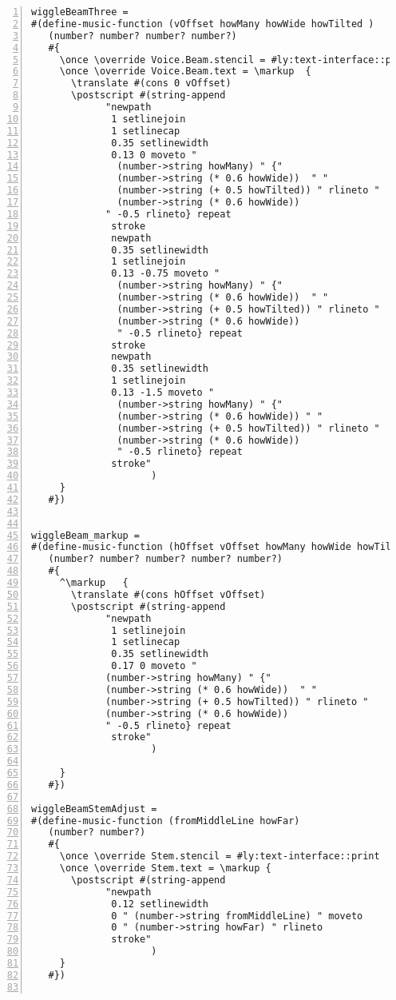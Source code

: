 \begin{Verbatim}[numbers=left,xleftmargin=5mm]
wiggleBeamThree =
#(define-music-function (vOffset howMany howWide howTilted )
   (number? number? number? number?)
   #{
     \once \override Voice.Beam.stencil = #ly:text-interface::print
     \once \override Voice.Beam.text = \markup 	{
       \translate #(cons 0 vOffset)
       \postscript #(string-append
             "newpath 
              1 setlinejoin 
              1 setlinecap 
              0.35 setlinewidth 
              0.13 0 moveto "
               (number->string howMany) " {"
               (number->string (* 0.6 howWide))  " "
               (number->string (+ 0.5 howTilted)) " rlineto "
               (number->string (* 0.6 howWide))
             " -0.5 rlineto} repeat 
              stroke 
              newpath 
              0.35 setlinewidth 
              1 setlinejoin 
              0.13 -0.75 moveto "
               (number->string howMany) " {"
               (number->string (* 0.6 howWide))  " "
               (number->string (+ 0.5 howTilted)) " rlineto "
               (number->string (* 0.6 howWide))
               " -0.5 rlineto} repeat 
              stroke 
              newpath 
              0.35 setlinewidth 
              1 setlinejoin 
              0.13 -1.5 moveto "
               (number->string howMany) " {"
               (number->string (* 0.6 howWide)) " "
               (number->string (+ 0.5 howTilted)) " rlineto "
               (number->string (* 0.6 howWide))
               " -0.5 rlineto} repeat 
              stroke"
                     )
     }
   #})


wiggleBeam_markup =
#(define-music-function (hOffset vOffset howMany howWide howTilted )
   (number? number? number? number? number?)
   #{
     ^\markup 	{
       \translate #(cons hOffset vOffset)
       \postscript #(string-append
             "newpath 
              1 setlinejoin 
              1 setlinecap 
              0.35 setlinewidth 
              0.17 0 moveto "
             (number->string howMany) " {"
             (number->string (* 0.6 howWide))  " "
             (number->string (+ 0.5 howTilted)) " rlineto "
             (number->string (* 0.6 howWide))
             " -0.5 rlineto} repeat 
              stroke"
                     )

     }
   #})

wiggleBeamStemAdjust =
#(define-music-function (fromMiddleLine howFar)
   (number? number?)
   #{
     \once \override Stem.stencil = #ly:text-interface::print
     \once \override Stem.text = \markup {
       \postscript #(string-append
             "newpath 
              0.12 setlinewidth 
              0 " (number->string fromMiddleLine) " moveto 
              0 " (number->string howFar) " rlineto 
              stroke"
                     )
     }
   #})
   

\end{Verbatim}
